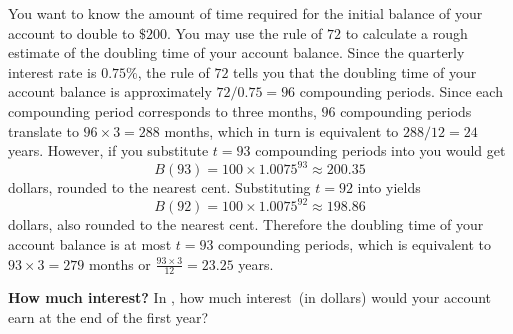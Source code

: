 \documentclass[a4paper,oneside,12pt]{article}
\begin{document}
\begin{solution}
You want to know the amount of time required for the initial balance
of your account to double to $\$200$.  You may use the rule of $72$ to
calculate a rough estimate of the doubling time of your account
balance.  Since the quarterly interest rate is $0.75\%$, the rule of
$72$ tells you that the doubling time of your account balance is
approximately $72 / 0.75 = 96$ compounding periods.  Since each
compounding period corresponds to three months, $96$ compounding
periods translate to $96 \times 3 = 288$ months, which in turn is
equivalent to $288 / 12 = 24$ years.  However, if you substitute
$t = 93$ compounding periods into
 you would get
\[
B(93)
=
100 \times 1.0075^{93}
\approx
200.35
\]
dollars, rounded to the nearest cent.  Substituting $t = 92$ into
 yields
\[
B(92)
=
100 \times 1.0075^{92}
\approx
198.86
\]
dollars, also rounded to the nearest cent.  Therefore the doubling
time of your account balance is at most $t = 93$ compounding periods,
which is equivalent to $93 \times 3 = 279$ months or
$\frac{93 \times 3}{12} = 23.25$ years.
\end{solution}

\begin{exercise}
\textbf{How much interest?}
In , how much
interest~(in dollars) would your account earn at the end of the first
year?
\end{exercise}

\end{document}
